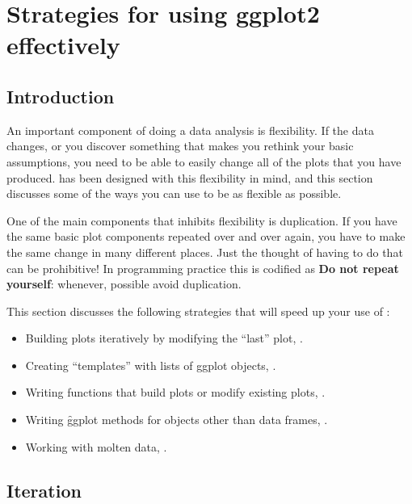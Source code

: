

\chapter{Strategies for using ggplot2 effectively}

\section{Introduction}

An important component of doing a data analysis is flexibility.  If the data changes, or you discover something that makes you rethink your basic assumptions, you need to be able to easily change all of the plots that you have produced.  \ggplot has been designed with this flexibility in mind, and this section discusses some of the ways you can use \ggplot to be as flexible as possible.

One of the main components that inhibits flexibility is duplication. If you have the same basic plot components repeated over and over again, you have to make the same change in many different places.  Just the thought of having to do that can be prohibitive!  In programming practice this is codified as {\bf Do not repeat yourself}: whenever, possible avoid duplication.

This section discusses the following strategies that will speed up your use of \ggplot:

\begin{itemize}
  \item Building plots iteratively by modifying the ``last'' plot, .

  \item Creating ``templates'' with lists of ggplot objects, .

  \item Writing functions that build plots or modify existing plots, .

  \item Writing \f{ggplot} methods for objects other than data frames, .

  \item Working with molten data, .

\end{itemize}

\section{Iteration}
\label{sec:iteration}

